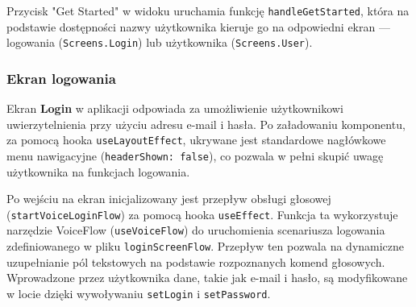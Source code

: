 Przycisk "Get Started" w widoku uruchamia funkcję \texttt{handleGetStarted}, która na podstawie dostępności nazwy użytkownika kieruje go na odpowiedni ekran — logowania (\texttt{Screens.Login}) lub użytkownika (\texttt{Screens.User}).

\subsubsection{Ekran logowania}

Ekran \textbf{Login} w aplikacji odpowiada za umożliwienie użytkownikowi uwierzytelnienia przy użyciu adresu e-mail i hasła. Po załadowaniu komponentu, za pomocą hooka \texttt{useLayoutEffect}, ukrywane jest standardowe nagłówkowe menu nawigacyjne (\texttt{headerShown: false}), co pozwala w pełni skupić uwagę użytkownika na funkcjach logowania.

Po wejściu na ekran inicjalizowany jest przepływ obsługi głosowej (\texttt{startVoiceLoginFlow}) za pomocą hooka \texttt{useEffect}. Funkcja ta wykorzystuje narzędzie VoiceFlow (\texttt{useVoiceFlow}) do uruchomienia scenariusza logowania zdefiniowanego w pliku \texttt{loginScreenFlow}. Przepływ ten pozwala na dynamiczne uzupełnianie pól tekstowych na podstawie rozpoznanych komend głosowych. Wprowadzone przez użytkownika dane, takie jak e-mail i hasło, są modyfikowane w locie dzięki wywoływaniu \texttt{setLogin} i \texttt{setPassword}.

